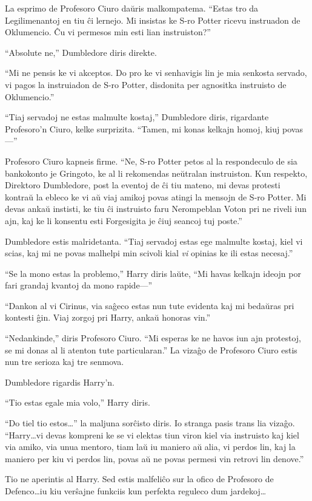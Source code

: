 La esprimo de Profesoro Ciuro daŭris malkompatema. ``Estas tro da
Legilimenantoj en tiu ĉi lernejo. Mi insistas ke S-ro Potter ricevu
instruadon de Oklumencio. Ĉu vi permesos min esti lian instruiston?''

``Absolute ne,'' Dumbledore diris direkte.

``Mi ne pensis ke vi akceptos.  Do pro ke vi senhavigis lin je mia
senkosta servado, vi pagos la instruiadon de S-ro Potter, disdonita
per agnositka instruisto de Oklumencio.''

``Tiaj servadoj ne estas malmulte kostaj,'' Dumbledore diris,
rigardante Profesoro'n Ciuro, kelke surprizita. ``Tamen, mi konas
kelkajn homoj, kiuj povas—''

Profesoro Ciuro kapneis firme. ``Ne, S-ro Potter petos al la
respondeculo de sia bankokonto je Gringoto, ke al li rekomendas
neŭtralan instruiston. Kun respekto, Direktoro Dumbledore, post la
eventoj de ĉi tiu mateno, mi devas protesti kontraŭ la ebleco ke vi aŭ
viaj amikoj povas atingi la mensojn de S-ro Potter. Mi devas ankaŭ
instisti, ke tiu ĉi instruisto faru Nerompeblan Voton pri ne riveli
iun ajn, kaj ke li konsentu esti Forgesigita je ĉiuj seancoj tuj
poste.''

Dumbledore estis malridetanta. ``Tiaj servadoj estas ege malmulte
kostaj, kiel vi scias, kaj mi ne povas malhelpi min scivoli kial
\emph{vi} opinias ke ili estas necesaj.''

``Se la mono estas la problemo,'' Harry diris laŭte, ``Mi havas
kelkajn ideojn por fari grandaj kvantoj da mono rapide—''

``Dankon al vi Cirinus, via saĝeco estas nun tute evidenta kaj mi
bedaŭras pri kontesti ĝin. Viaj zorgoj pri Harry, ankaŭ honoras vin.''

``Nedankinde,'' diris Profesoro Ciuro. ``Mi esperas ke ne havos iun
ajn protestoj, se mi donas al li atenton tute particularan.'' La
vizaĝo de Profesoro Ciuro estis nun tre serioza kaj tre senmova.

Dumbledore rigardis Harry'n.

``Tio estas egale mia volo,'' Harry diris.

``Do tiel tio estos\ldots'' la maljuna sorĉisto diris. Io stranga
pasis trans lia vizaĝo. ``Harry\ldots vi devas kompreni ke se vi
elektas tiun viron kiel via instruisto kaj kiel via amiko, via unua
mentoro, tiam laŭ iu maniero aŭ alia, vi perdos lin, kaj la maniero
per kiu vi perdos lin, povas aŭ ne povas permesi vin retrovi lin
denove.''

Tio ne aperintis al Harry. Sed estis malfeliĉo sur la ofico de
Profesoro de Defenco\ldots iu kiu verŝajne funkciis kun perfekta
reguleco dum jardekoj\ldots

